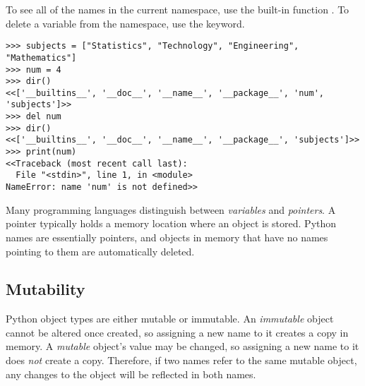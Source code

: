 To see all of the names in the current namespace, use the built-in function .
To delete a variable from the namespace, use the  keyword.

\begin{lstlisting}
>>> subjects = ["Statistics", "Technology", "Engineering", "Mathematics"]
>>> num = 4
>>> dir()
<<['__builtins__', '__doc__', '__name__', '__package__', 'num', 'subjects']>>
>>> del num
>>> dir()
<<['__builtins__', '__doc__', '__name__', '__package__', 'subjects']>>
>>> print(num)
<<Traceback (most recent call last):
  File "<stdin>", line 1, in <module>
NameError: name 'num' is not defined>>
\end{lstlisting}

\begin{info}
Many programming languages distinguish between \emph{variables} and \emph{pointers}.
A pointer typically holds a memory location where an object is stored.
% 
Python names are essentially pointers, %
and objects in memory that have no names pointing to them are automatically deleted.
\end{info}

\subsection*{Mutability}

Python object types are either mutable or immutable.
An \emph{immutable} object cannot be altered once created, so assigning a new name to it creates a copy in memory.
A \emph{mutable} object's value may be changed, so assigning a new name to it does \emph{not} create a copy.
Therefore, if two names refer to the same mutable object, any changes to the object will be reflected in both names.

